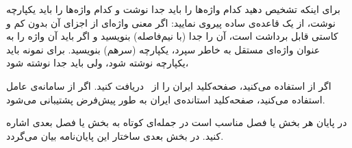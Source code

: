 	 برای اینکه تشخیص دهید کدام واژه‌ها را باید جدا نوشت و کدام واژه‌ها را باید یکپارچه نوشت، از یک قاعده‌ی ساده پیروی نمایید:
	اگر معنی واژه‌ای از اجزای آن بدون کم و کاستی قابل برداشت است، آن را جدا (با نیم‌فاصله) بنویسید و اگر باید آن واژه را به عنوان واژه‌ای مستقل به خاطر سپرد،
	یکپارچه (سرهم) بنویسید. برای نمونه  باید یکپارچه نوشته شود، ولی  باید جدا نوشته شود،
	
	 اگر از   استفاده می‌کنید، صفحه‌کلید  ایران را از~ دریافت کنید. اگر از  سامانه‌ی عامل  استفاده می‌کنید،   صفحه‌کلید استانده‌ی ایران  به طور پیش‌فرض پشتیبانی می‌شود.
	

در پایان هر بخش یا فصل مناسب است در جمله‌ای کوتاه به بخش یا فصل بعدی اشاره کنید. در بخش بعدی ساختار این پایان‌نامه بیان می‌گردد.
